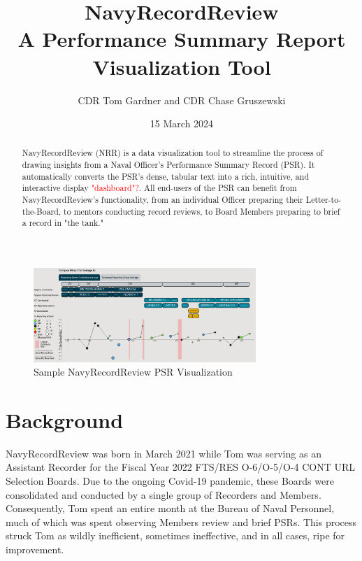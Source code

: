 \documentclass[UTF8]{article}
\begin{document}
\title{
  NavyRecordReview \\
  \large A Performance Summary Report Visualization Tool
}

\author{CDR Tom Gardner and CDR Chase Gruszewski}
\date{15 March 2024}
\maketitle


\begin{abstract}
NavyRecordReview (NRR) is a data visualization tool to streamline the process of
drawing insights from a Naval Officer's Performance Summary Record (PSR). It 
automatically converts the PSR's dense, tabular text into a rich, intuitive, 
and interactive display \textcolor{red}{"dashboard"?}. All end-users of the PSR
can benefit from NavyRecordReview's functionality, from an individual Officer 
preparing their Letter-to-the-Board, to mentors conducting record reviews, to
Board Members preparing to brief a record in "the tank." 
\end{abstract}



\begin{figure}[h!]
 \centering
 \includegraphics[width=0.75\textwidth]{nrr_dashboard.png}
 \caption{Sample NavyRecordReview PSR Visualization}
\end{figure}


\section{Background}
NavyRecordReview was born in March 2021 while Tom was serving as an Assistant
Recorder for the Fiscal Year 2022 FTS/RES O-6/O-5/O-4 CONT URL Selection Boards.
Due to the ongoing Covid-19 pandemic, these Boards were consolidated and
conducted by a single group of Recorders and Members. Consequently, Tom spent an
entire month at the Bureau of Naval Personnel, much of which was spent
observing Members review and brief PSRs. This process struck Tom as wildly
inefficient, sometimes ineffective, and in all cases, ripe for improvement.\\
\end{document}
